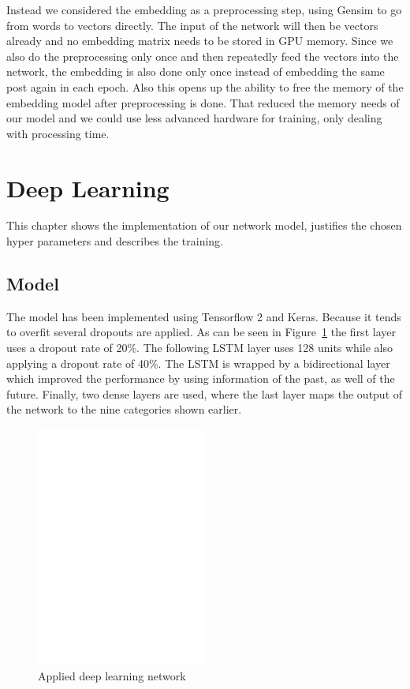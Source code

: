 \documentclass[11pt,a4paper]{article}
\begin{document}
Instead we considered the embedding as a preprocessing step, using Gensim to go from words to vectors directly.
The input of the network will then be vectors already and no embedding matrix needs to be stored in GPU memory.
Since we also do the preprocessing only once and then repeatedly feed the vectors into the network, the embedding is also done only once instead of embedding the same post again in each epoch.
Also this opens up the ability to free the memory of the embedding model after preprocessing is done.
That reduced the memory needs of our model and we could use less advanced hardware for training, only dealing with processing time.


\section{Deep Learning}

This chapter shows the implementation of our network model, justifies the chosen hyper parameters and describes the training.


\subsection{Model}
The model has been implemented using Tensorflow 2 and Keras. Because it tends to overfit several dropouts are applied. As can be seen in Figure~\ref{fig:model} the first layer uses a dropout rate of 20\%. The following LSTM layer uses 128 units while also applying a dropout rate of 40\%. The LSTM is wrapped by a bidirectional layer which improved the performance by using information of the past, as well of the future. Finally, two dense layers are used, where the last layer maps the output of the network to the nine categories shown earlier.

\begin{figure}[h!]
	\centering
	\includegraphics[trim={1cm 19.5cm 5cm 3cm},clip,page=2, width=0.5\textwidth]{img/model}
	\caption{Applied deep learning network}
	\label{fig:model}
\end{figure}
\end{document}
